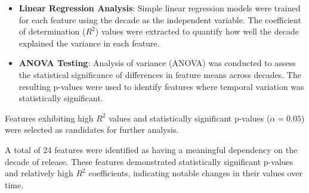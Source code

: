 \begin{itemize}
  \item \textbf{Linear Regression Analysis}: Simple linear regression models
    were trained for each feature using the decade as the independent variable.
    The coefficient of determination ($R^2$) values were extracted to quantify
    how well the decade explained the variance in each feature.
  \item \textbf{ANOVA Testing}: Analysis of variance (ANOVA) was conducted to
    assess the statistical significance of differences in feature means across
    decades. The resulting p-values were used to identify features where
    temporal variation was statistically significant.
\end{itemize}
Features exhibiting high $R^2$ values and statistically significant p-values
($\alpha = 0.05$) were selected as candidates for further analysis.


A total of 24 features were identified as having a meaningful dependency on the
decade of release. These  features demonstrated statistically significant
p-values and relatively high $R^2$ coefficients, indicating notable changes in
their values over time.


